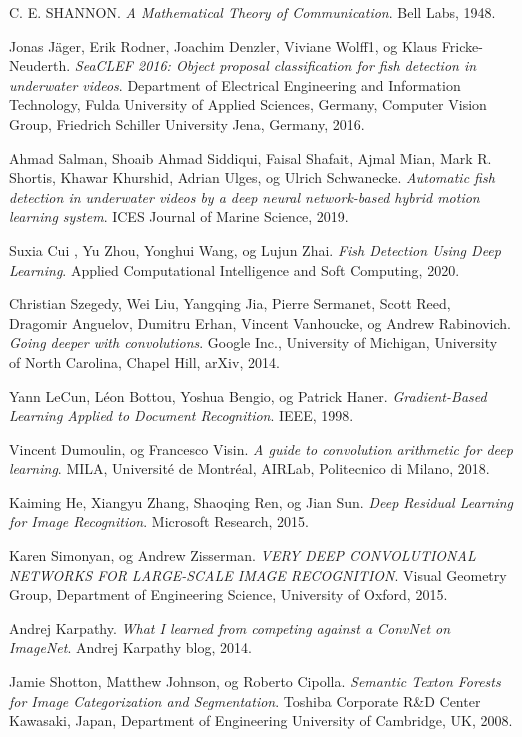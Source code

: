 \documentclass[11ot]{article}
\begin{document}
\begin{thebibliography}{9}
C. E. SHANNON. 
\textit{A Mathematical Theory of Communication}. 
Bell Labs, 1948.

Jonas Jäger, Erik Rodner, Joachim Denzler, Viviane Wolff1, og Klaus Fricke-Neuderth. 
\textit{SeaCLEF 2016: Object proposal classification for fish detection in underwater videos}. 
Department of Electrical Engineering and Information Technology, Fulda University of Applied Sciences, Germany, Computer Vision Group, Friedrich Schiller University Jena, Germany, 2016.

Ahmad Salman, Shoaib Ahmad Siddiqui, Faisal Shafait, Ajmal Mian, Mark R. Shortis, Khawar Khurshid, Adrian Ulges, og Ulrich Schwanecke. 
\textit{Automatic fish detection in underwater videos by a deep neural network-based hybrid motion learning system}. 
ICES Journal of Marine Science, 2019.

Suxia Cui , Yu Zhou, Yonghui Wang, og Lujun Zhai. 
\textit{Fish Detection Using Deep Learning}. 
Applied Computational Intelligence and Soft Computing, 2020.

Christian Szegedy, Wei Liu, Yangqing Jia, Pierre Sermanet, Scott Reed, Dragomir Anguelov, Dumitru Erhan, Vincent Vanhoucke, og Andrew Rabinovich. 
\textit{Going deeper with convolutions}. 
Google Inc., University of Michigan, University of North Carolina, Chapel Hill, arXiv, 2014.

Yann LeCun, Léon Bottou, Yoshua Bengio, og Patrick Haner. 
\textit{Gradient-Based Learning Applied to Document Recognition}. 
IEEE, 1998.

Vincent Dumoulin, og Francesco Visin. 
\textit{A guide to convolution arithmetic for deep learning}. 
MILA, Université de Montréal, AIRLab, Politecnico di Milano, 2018.

Kaiming He, Xiangyu Zhang, Shaoqing Ren, og Jian Sun. 
\textit{Deep Residual Learning for Image Recognition}. 
Microsoft Research, 2015.

Karen Simonyan, og Andrew Zisserman. 
\textit{VERY DEEP CONVOLUTIONAL NETWORKS FOR LARGE-SCALE IMAGE RECOGNITION}. 
Visual Geometry Group, Department of Engineering Science, University of Oxford, 2015.

Andrej Karpathy. 
\textit{What I learned from competing against a ConvNet on ImageNet}. 
Andrej Karpathy blog, 2014.

Jamie Shotton, Matthew Johnson, og Roberto Cipolla. 
\textit{Semantic Texton Forests for Image Categorization and Segmentation}. 
Toshiba Corporate R\&D Center Kawasaki, Japan, Department of Engineering University of Cambridge, UK, 2008.


\end{thebibliography}
\end{document}
